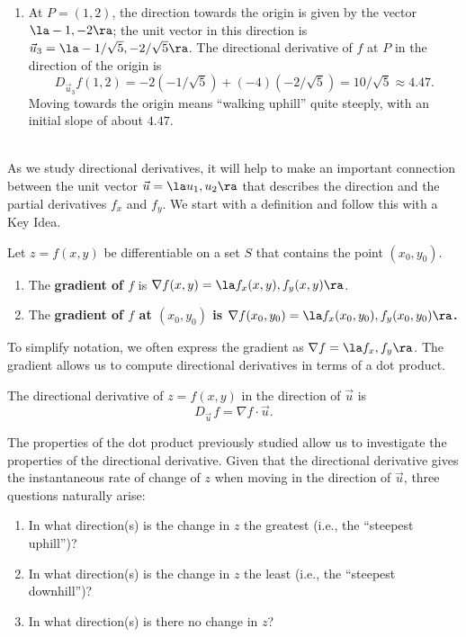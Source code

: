 {\begin{enumerate}
	Finding these directions of ``no elevation change'' is important.
	
	\item		At $P=(1,2)$, the direction towards the origin is given by the vector $\la -1,-2\ra$; the unit vector in this direction is $\vec u_3=\la -1/\sqrt{5},-2/\sqrt{5}\ra$. The directional derivative of $f$ at $P$ in the direction of the origin is
	$$D_{\vec u_3}f(1,2) = -2(-1/\sqrt{5}) + (-4)(-2/\sqrt{5}) = 10/\sqrt{5} \approx 4.47.$$
	Moving towards the origin means ``walking uphill'' quite steeply, with an initial slope of about $4.47$.
\end{enumerate}
\baselineskip
}\\

As we study directional derivatives, it will help to make an important connection between the unit vector $\vec u = \la u_1,u_2\ra$ that describes the direction and the partial derivatives $f_x$ and $f_y$. We start with a definition and follow this with a Key Idea.

{Let $z=f(x,y)$ be differentiable on a set $S$ that contains the point $(x_0,y_0)$.
\begin{enumerate}
	\item The \textbf{gradient of $f$} is $\nabla f(x,y) = \la f_x(x,y),f_y(x,y)\ra$.
	\item The \textbf{gradient of $f$ at $(x_0,y_0)$ is $\nabla f(x_0,y_0) = \la f_x(x_0,y_0),f_y(x_0,y_0)\ra$.}
\end{enumerate}
}


To simplify notation, we often express the gradient as $\nabla f = \la f_x, f_y\ra$. The gradient allows us to compute directional derivatives in terms of a dot product.

{%
The directional derivative of $z=f(x,y)$ in the direction of $\vec u$ is
$$D_{\vec u\,}f = \nabla f\cdot \vec u.$$
}

The properties of the dot product previously studied allow us to investigate the properties of the directional derivative. Given that the directional derivative gives the instantaneous rate of change of $z$ when moving in the direction of $\vec u$, three questions naturally arise:
\begin{enumerate}
	\item In what direction(s) is the change in $z$ the greatest (i.e., the ``steepest uphill'')?
	\item In what direction(s) is the change in $z$ the least (i.e.,  the ``steepest downhill'')?
	\item In what direction(s) is there no change in $z$?
\end{enumerate}


